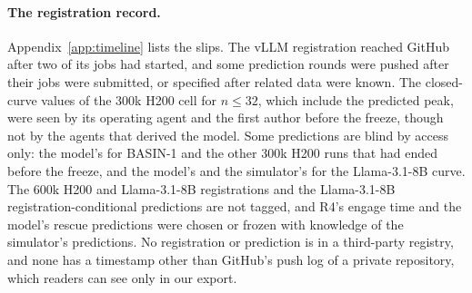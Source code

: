 \paragraph{The registration record.} Appendix~\ref{app:timeline} lists the slips. The vLLM registration reached GitHub after two of its jobs had started, and some prediction rounds were pushed after their jobs were submitted, or specified after related data were known. The closed-curve values of the 300k H200 cell for $n\le32$, which include the predicted peak, were seen by its operating agent and the first author before the freeze, though not by the agents that derived the model. Some predictions are blind by access only: the model's for BASIN-1 and the other 300k H200 runs that had ended before the freeze, and the model's and the simulator's for the Llama-3.1-8B curve. The 600k H200 and Llama-3.1-8B registrations and the Llama-3.1-8B registration-conditional predictions are not tagged, and R4's engage time and the model's rescue predictions were chosen or frozen with knowledge of the simulator's predictions. No registration or prediction is in a third-party registry, and none has a timestamp other than GitHub's push log of a private repository, which readers can see only in our export.
